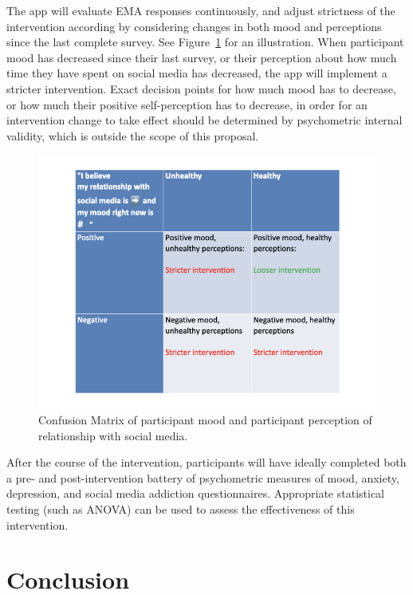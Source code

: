 \documentclass[
  man]{apa6}
\begin{document}
The app will evaluate EMA responses continuously, and adjust strictness of
the intervention according by considering changes in both mood and perceptions
since the last complete survey. See Figure~\ref{fig:conf} for an illustration.
When participant mood has decreased since their last survey, or their perception
about how much time they have spent on social media has decreased, the app will
implement a stricter intervention. Exact decision points for how much mood has
to decrease, or how much their positive self-perception has to decrease, in
order for an intervention change to take effect should
be determined by psychometric internal validity, which is outside the scope of
this proposal.




\begin{figure}
\centering
\includegraphics{confusion_matrix.001.jpeg}
\caption{\label{fig:conf}Confusion Matrix of participant mood and participant perception
of relationship with social media.}
\end{figure}

After the course of the intervention, participants will have ideally
completed both a pre- and post-intervention battery of psychometric measures of
mood, anxiety, depression, and social media addiction questionnaires. Appropriate
statistical testing (such as ANOVA) can be used to assess the effectiveness of
this intervention.

\hypertarget{conclusion}{%
\section{Conclusion}\label{conclusion}}
\end{document}

